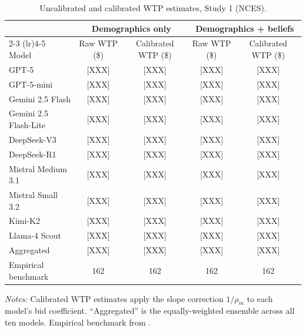 \documentclass[12pt]{article}
\begin{document}
\begin{table}[h]
    \centering
    \caption{Uncalibrated and calibrated WTP estimates, Study 1 (NCES).}
    \label{tab:calibrated-nces}
    \begin{threeparttable}
    \footnotesize
    \begin{tabular}{lcccc}
        \toprule
         & \multicolumn{2}{c}{Demographics only} & \multicolumn{2}{c}{Demographics + beliefs} \\
        \cmidrule(lr){2-3} \cmidrule(lr){4-5}
        Model & Raw WTP (\$) & Calibrated WTP (\$) & Raw WTP (\$) & Calibrated WTP (\$) \\
        \midrule
        GPT-5                  & [XXX] & [XXX] & [XXX] & [XXX] \\
        GPT-5-mini             & [XXX] & [XXX] & [XXX] & [XXX] \\
        Gemini 2.5 Flash       & [XXX] & [XXX] & [XXX] & [XXX] \\
        Gemini 2.5 Flash-Lite  & [XXX] & [XXX] & [XXX] & [XXX] \\
        DeepSeek-V3            & [XXX] & [XXX] & [XXX] & [XXX] \\
        DeepSeek-R1            & [XXX] & [XXX] & [XXX] & [XXX] \\
        Mistral Medium 3.1     & [XXX] & [XXX] & [XXX] & [XXX] \\
        Mistral Small 3.2      & [XXX] & [XXX] & [XXX] & [XXX] \\
        Kimi-K2                & [XXX] & [XXX] & [XXX] & [XXX] \\
        Llama-4 Scout          & [XXX] & [XXX] & [XXX] & [XXX] \\
        \midrule
        Aggregated             & [XXX] & [XXX] & [XXX] & [XXX] \\
        Empirical benchmark    & 162 & 162 & 162 & 162 \\
        \bottomrule
    \end{tabular}
    \begin{tablenotes}\footnotesize
        \item \textit{Notes:} Calibrated WTP estimates apply the slope correction $1/\rho_m$ to each model's bid coefficient. ``Aggregated'' is the equally-weighted ensemble across all ten models. Empirical benchmark from \textcite{Aldy2012}.
    \end{tablenotes}
    \end{threeparttable}
\end{table}
\end{document}
